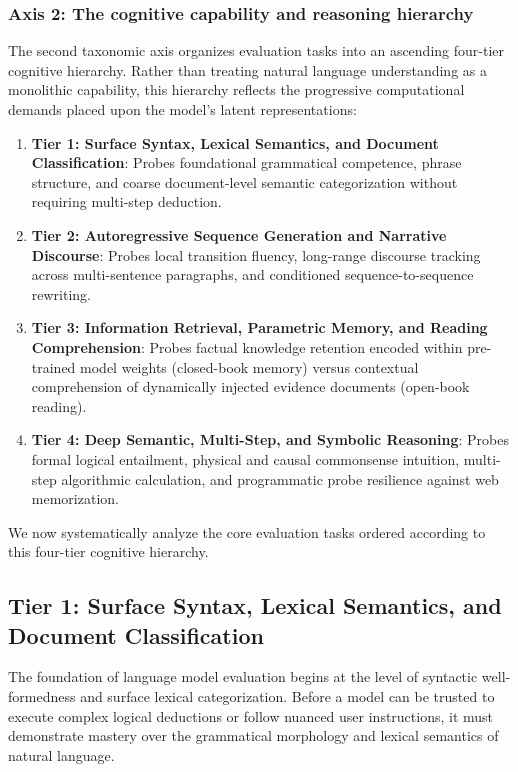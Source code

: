 \documentclass[../../../main.tex]{subfiles}
\begin{document}
\subsubsection{Axis 2: The cognitive capability and reasoning hierarchy}
The second taxonomic axis organizes evaluation tasks into an ascending four-tier cognitive hierarchy. Rather than treating natural language understanding as a monolithic capability, this hierarchy reflects the progressive computational demands placed upon the model's latent representations:
\begin{enumerate}
    \item \textbf{Tier 1: Surface Syntax, Lexical Semantics, and Document Classification}: Probes foundational grammatical competence, phrase structure, and coarse document-level semantic categorization without requiring multi-step deduction.
    \item \textbf{Tier 2: Autoregressive Sequence Generation and Narrative Discourse}: Probes local transition fluency, long-range discourse tracking across multi-sentence paragraphs, and conditioned sequence-to-sequence rewriting.
    \item \textbf{Tier 3: Information Retrieval, Parametric Memory, and Reading Comprehension}: Probes factual knowledge retention encoded within pre-trained model weights (closed-book memory) versus contextual comprehension of dynamically injected evidence documents (open-book reading).
    \item \textbf{Tier 4: Deep Semantic, Multi-Step, and Symbolic Reasoning}: Probes formal logical entailment, physical and causal commonsense intuition, multi-step algorithmic calculation, and programmatic probe resilience against web memorization.
\end{enumerate}

We now systematically analyze the core evaluation tasks ordered according to this four-tier cognitive hierarchy.

\subsection{Tier 1: Surface Syntax, Lexical Semantics, and Document Classification}
\label{subsec:tier1_syntax_classification}

The foundation of language model evaluation begins at the level of syntactic well-formedness and surface lexical categorization. Before a model can be trusted to execute complex logical deductions or follow nuanced user instructions, it must demonstrate mastery over the grammatical morphology and lexical semantics of natural language.
\end{document}
